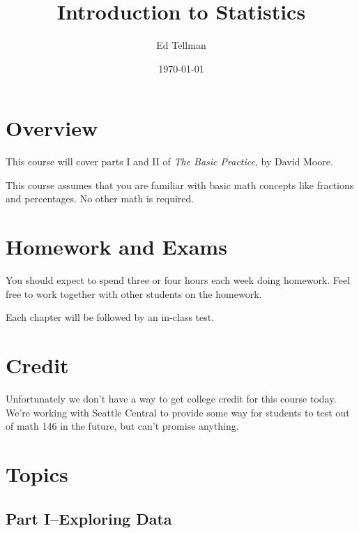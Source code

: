 \documentclass[fleqn, onecolumn]{article}
\title{Introduction to Statistics}
\author{Ed Tellman}
\date{\today}
\begin{document}
  \maketitle

  \section{Overview}
  This course will cover parts I and II of {\em The Basic Practice}, by David Moore.  

  This course assumes that you are familiar with basic math concepts like fractions and percentages.  No other math is
  required.

  \section{Homework and Exams}

  You should expect to spend three or four hours each week doing homework.  Feel free to work together with other students
  on the homework.

  Each chapter will be followed by an in-class test.  

  \section{Credit}
  Unfortunately we don't have a way to get college credit for this course today.  We're working with Seattle Central to
  provide some way for students to test out of math 146 in the future, but can't promise anything.

  \section{Topics}

  \subsection{Part I--Exploring Data}
\end{document}
